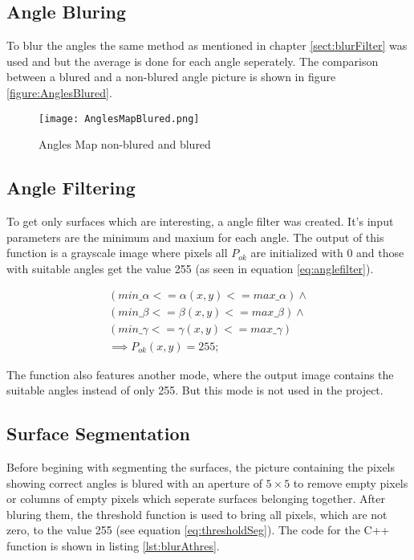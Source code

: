 \subsection{Angle Bluring}

To blur the angles the same method as mentioned in chapter \vref{sect:blurFilter} was used and
but the average is done for each angle seperately. The comparison between a blured and a non-blured
angle picture is shown in figure \vref{figure:AnglesBlured}.

\begin{figure}[H]
\begin{center}
  \texttt{[image: AnglesMapBlured.png]}
  \caption{Angles Map non-blured and blured}
  \label{figure:AnglesBlured}
\end{center}
\end{figure}


\subsection{Angle Filtering}

To get only surfaces which are interesting, a angle filter was created. It's input parameters
are the minimum and maxium for each angle. The output of this function is a grayscale image
where pixels all $P_{ok}$ are initialized with 0 and those with suitable angles get the value 255
(as seen in equation \vref{eq:anglefilter}).

\begin{gather}
(min\_\alpha  <= \alpha(x,y) <=max\_\alpha ) \wedge \nonumber\\ 
(min\_\beta  <= \beta(x,y) <=max\_\beta )\wedge\nonumber\\
(min\_\gamma  <= \gamma(x,y) <=max\_\gamma )\nonumber\\
\implies P_{ok}(x,y) = 255;
\label{eq:anglefilter}
\end{gather}

The function also features another mode, where the output image contains the suitable angles instead of only 255.
But this mode is not used in the project. 

\subsection{Surface Segmentation}

Before begining with segmenting the surfaces, the picture containing the pixels showing 
correct angles is blured with an aperture of $5 \times 5$ to remove empty pixels or columns of empty pixels 
which seperate surfaces belonging together. After bluring them, the threshold function is used to bring 
all pixels, which are not zero, to the value 255 (see equation \vref{eq:thresholdSeg}).
The code for the C++ function is shown in listing \vref{lst:blurAthres}.

